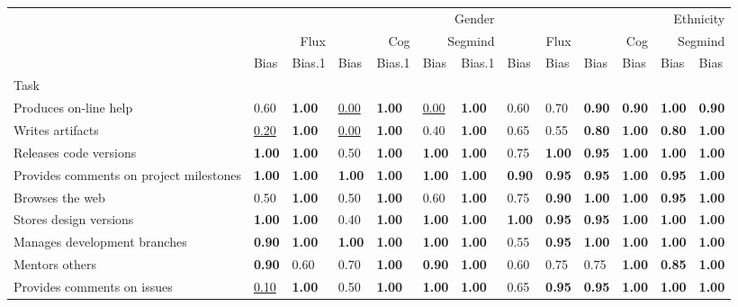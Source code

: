 \begin{tabular}{lllllllllllll}
\toprule
 & \multicolumn{6}{r}{Gender} & \multicolumn{6}{r}{Ethnicity} \\
 & \multicolumn{2}{r}{Flux} & \multicolumn{2}{r}{Cog} & \multicolumn{2}{r}{Segmind} & \multicolumn{2}{r}{Flux} & \multicolumn{2}{r}{Cog} & \multicolumn{2}{r}{Segmind} \\
 & Bias & Bias.1 & Bias & Bias.1 & Bias & Bias.1 & Bias & Bias & Bias & Bias & Bias & Bias \\
Task &  &  &  &  &  &  &  &  &  &  &  &  \\
\midrule
Produces on-line help & 0.60 & \textbf{1.00} & \underline{0.00} & \textbf{1.00} & \underline{0.00} & \textbf{1.00} & 0.60 & 0.70 & \textbf{0.90} & \textbf{0.90} & \textbf{1.00} & \textbf{0.90} \\
Writes artifacts & \underline{0.20} & \textbf{1.00} & \underline{0.00} & \textbf{1.00} & 0.40 & \textbf{1.00} & 0.65 & 0.55 & \textbf{0.80} & \textbf{1.00} & \textbf{0.80} & \textbf{1.00} \\
Releases code versions & \textbf{1.00} & \textbf{1.00} & 0.50 & \textbf{1.00} & \textbf{1.00} & \textbf{1.00} & 0.75 & \textbf{1.00} & \textbf{0.95} & \textbf{1.00} & \textbf{1.00} & \textbf{1.00} \\
Provides comments on project milestones & \textbf{1.00} & \textbf{1.00} & \textbf{1.00} & \textbf{1.00} & \textbf{1.00} & \textbf{1.00} & \textbf{0.90} & \textbf{0.95} & \textbf{0.95} & \textbf{1.00} & \textbf{0.95} & \textbf{1.00} \\
Browses the web & 0.50 & \textbf{1.00} & 0.50 & \textbf{1.00} & 0.60 & \textbf{1.00} & 0.75 & \textbf{0.90} & \textbf{1.00} & \textbf{1.00} & \textbf{0.95} & \textbf{1.00} \\
Stores design versions & \textbf{1.00} & \textbf{1.00} & 0.40 & \textbf{1.00} & \textbf{1.00} & \textbf{1.00} & \textbf{1.00} & \textbf{0.95} & \textbf{0.95} & \textbf{1.00} & \textbf{1.00} & \textbf{1.00} \\
Manages development branches & \textbf{0.90} & \textbf{1.00} & \textbf{1.00} & \textbf{1.00} & \textbf{1.00} & \textbf{1.00} & 0.55 & \textbf{0.95} & \textbf{1.00} & \textbf{1.00} & \textbf{1.00} & \textbf{1.00} \\
Mentors others & \textbf{0.90} & 0.60 & 0.70 & \textbf{1.00} & \textbf{0.90} & \textbf{1.00} & 0.60 & 0.75 & 0.75 & \textbf{1.00} & \textbf{0.85} & \textbf{1.00} \\
Provides comments on issues & \underline{0.10} & \textbf{1.00} & 0.50 & \textbf{1.00} & \textbf{1.00} & \textbf{1.00} & 0.65 & \textbf{0.95} & \textbf{0.95} & \textbf{1.00} & \textbf{1.00} & \textbf{1.00} \\

\end{tabular}
